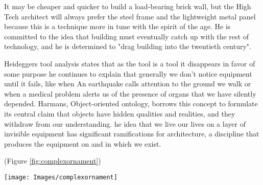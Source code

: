 


It may be cheaper and quicker to build a load-bearing brick wall, but
the High Tech architect will always prefer the steel frame and the lightweight metal panel because this is a technique more in tune with the spirit of the age.
He is committed to the idea that building must eventually catch up with the rest of technology, and he is determined to "drag building into the twentieth century".\cite{Davies1988}

Heideggers tool analysis states that as the tool is a tool it disappears in favor of some purpose he continues to explain that generally we don't notice equipment until it fails, like when An earthquake calls attention to the ground we walk or when a medical problem alerts us of the presence of organs that we have silently depended\cite{Harman2011}.
Harmans, Object-oriented ontology, borrows this concept to formulate its central claim that objects have hidden qualities and realities, and they withdraw from our understanding.\cite{Gage2015}
he idea that we live our lives on a layer of invisible equipment has significant ramifications for architecture, a discipline that produces the equipment on and in which we exist.\cite{Gage2015}

(Figure \ref{fig:complexornament})

     \begin{figure*}[htb]
          \centering
          \texttt{[image: Images/complexornament]}
          \caption{Complex ornament reference  (\textit{Images edited from source)}}
          \label{fig:complexornament}
        \end{figure*}
